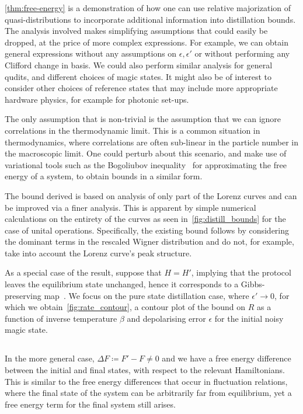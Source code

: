 \documentclass[pra,
aps,
twocolumn,
superscriptaddress,
groupedaddress,
nofootinbib,
reprint
]{revtex4-1}
\begin{document}
\cref{thm:free-energy} is a demonstration of how one can use relative majorization of quasi-distributions to incorporate additional information into distillation bounds.
The analysis involved makes simplifying assumptions that could easily be dropped, at the price of more complex expressions. For example, we can obtain general expressions without any assumptions on $\epsilon, \epsilon'$ or without performing any Clifford change in basis.
We could also perform similar analysis for general qudits, and different choices of magic states. It might also be of interest to consider other choices of reference states that may include more appropriate hardware physics, for example for photonic set-ups.

The only assumption that is non-trivial is the assumption that we can ignore correlations in the thermodynamic limit. This is a common situation in thermodynamics, where correlations are often sub-linear in the particle number in the macroscopic limit. One could perturb about this scenario, and make use of variational tools such as the Bogoliubov inequality~\cite{bogolyubov_1966} for approximating the free energy of a system, to obtain bounds in a similar form.

The bound derived is based on analysis of only part of the Lorenz curves and can be improved via a finer analysis.
This is apparent by simple numerical calculations on the entirety of the curves as seen in~\cref{fig:distill_bounds} for the case of unital operations.
Specifically, the existing bound follows by considering the dominant terms in the rescaled Wigner distribution and do not, for example, take into account the Lorenz curve's peak structure. 

As a special case of the result, suppose that $H=H'$, implying that the protocol leaves the equilibrium state unchanged, hence it corresponds to a Gibbs-preserving map~\cite{faist_2015}. We focus on the pure state distillation case, where $\epsilon' \rightarrow 0$, for which we obtain~\cref{fig:rate_contour}, a contour plot of the bound on $R$ as a function of inverse temperature $\beta$ and depolarising error $\epsilon$ for the initial noisy magic state.

\subsection{}

In the more general case, $\Delta F \coloneqq F' - F \ne 0$ and we have a free energy difference between the initial and final states, with respect to the relevant Hamiltonians. This is similar to the free energy differences that occur in fluctuation relations, where the final state of the system can be arbitrarily far from equilibrium, yet a free energy term for the final system still arises.
\end{document}
